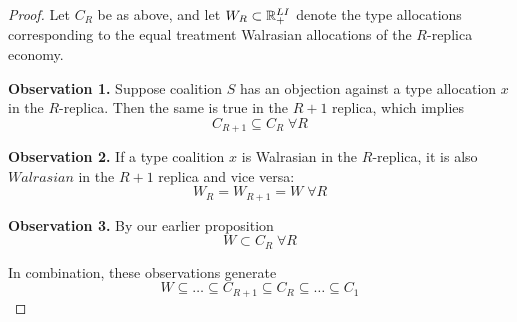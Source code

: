 \begin{proof}
  Let $C_R$ be as above, and let $W_R \subset {\mathbb R}^{LI}_+$ denote the
  type allocations corresponding to the equal treatment Walrasian
  allocations of the $R$-replica economy.

  \textbf{Observation 1.} Suppose coalition $S$ has an objection
  against a type allocation $x$ in the $R$-replica. Then the same is
  true in the $R+1$ replica, which implies
  \[
  C_{R+1} \subseteq C_R \; \forall R
  \]

  \textbf{Observation 2.} If a type coalition $x$ is Walrasian in the
  $R$-replica, it is also $Walrasian$ in the $R+1$ replica and vice
  versa:
  \[
  W_R = W_{R+1} = W \; \forall R
  \]

  \textbf{Observation 3.} By our earlier proposition
  \[
  W \subset C_R \; \forall R
  \]

  In combination, these observations generate
  \[
  W \subseteq \dots \subseteq C_{R+1} \subseteq C_R \subseteq \dots
  \subseteq C_1
  \]
\end{proof}
